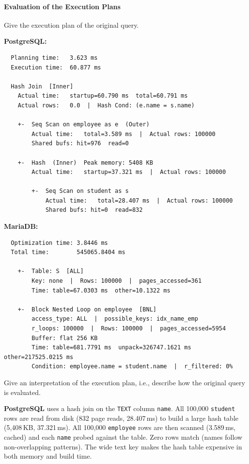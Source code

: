 \documentclass[11pt]{scrartcl}
\begin{document}
\paragraph{Evaluation of the Execution Plans}

Give the execution plan of the original query.

\textbf{PostgreSQL:}

{\small
\parskip0pt\begin{verbatim}
  Planning time:   3.623 ms
  Execution time:  60.877 ms

  Hash Join  [Inner]
    Actual time:   startup=60.790 ms  total=60.791 ms
    Actual rows:   0.0  |  Hash Cond: (e.name = s.name)

    +-  Seq Scan on employee as e  (Outer)
        Actual time:   total=3.589 ms  |  Actual rows: 100000
        Shared bufs: hit=976  read=0

    +-  Hash  (Inner)  Peak memory: 5408 KB
        Actual time:   startup=37.321 ms  |  Actual rows: 100000

        +-  Seq Scan on student as s
            Actual time:   total=28.407 ms  |  Actual rows: 100000
            Shared bufs: hit=0  read=832
\end{verbatim}}

\textbf{MariaDB:}

{\small
\parskip0pt\begin{verbatim}
  Optimization time: 3.8446 ms
  Total time:        545065.8404 ms

    +-  Table: S  [ALL]
        Key: none  |  Rows: 100000  |  pages_accessed=361
        Time: table=67.0303 ms  other=10.1322 ms

    +-  Block Nested Loop on employee  [BNL]
        access_type: ALL  |  possible_keys: idx_name_emp
        r_loops: 100000  |  Rows: 100000  |  pages_accessed=5954
        Buffer: flat 256 KB
        Time: table=681.7791 ms  unpack=326747.1621 ms  other=217525.0215 ms
        Condition: employee.name = student.name  |  r_filtered: 0%
\end{verbatim}}

Give an interpretation of the execution plan, i.e., describe how the original query is evaluated.

\textbf{PostgreSQL} uses a hash join on the \texttt{TEXT} column \texttt{name}. All 100,000 \texttt{student} rows are read from disk (832 page reads, 28.407\,ms) to build a large hash table (5,408\,KB, 37.321\,ms). All 100,000 \texttt{employee} rows are then scanned (3.589\,ms, cached) and each \texttt{name} probed against the table. Zero rows match (names follow non-overlapping patterns). The wide text key makes the hash table expensive in both memory and build time.
\end{document}
